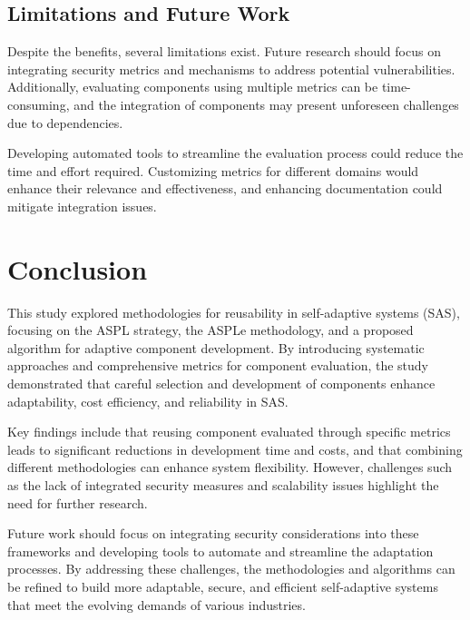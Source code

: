 \documentclass[a4paper,10pt]{article}
\begin{document}
\subsection{Limitations and Future Work}

Despite the benefits, several limitations exist. Future research should focus on integrating security metrics and mechanisms to address potential vulnerabilities. Additionally, evaluating components using multiple metrics can be time-consuming, and the integration of components may present unforeseen challenges due to dependencies.

Developing automated tools to streamline the evaluation process could reduce the time and effort required. Customizing metrics for different domains would enhance their relevance and effectiveness, and enhancing documentation could mitigate integration issues. 



\section{Conclusion}

This study explored methodologies for reusability in self-adaptive systems (SAS), focusing on the ASPL strategy, the ASPLe methodology, and a proposed algorithm for adaptive component development. By introducing systematic approaches and comprehensive metrics for component evaluation, the study demonstrated that careful selection and development of components enhance adaptability, cost efficiency, and reliability in SAS. 

Key findings include that reusing component evaluated through specific metrics leads to significant reductions in development time and costs, and that combining different methodologies can enhance system flexibility. However, challenges such as the lack of integrated security measures and scalability issues highlight the need for further research. 

Future work should focus on integrating security considerations into these frameworks and developing tools to automate and streamline the adaptation processes. By addressing these challenges, the methodologies and algorithms can be refined to build more adaptable, secure, and efficient self-adaptive systems that meet the evolving demands of various industries. 



\end{document}
